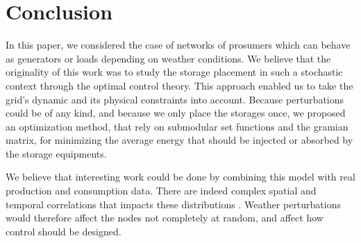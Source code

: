 \documentclass[conference]{IEEEtran}
\begin{document}
\section{Conclusion}
\label{sec:Conclusion}
In this paper, we considered the case of networks of prosumers which can behave as generators or loads depending on weather conditions. We believe that the originality of this work was to study the storage placement in such a stochastic context through the optimal control theory. This approach enabled us to take the grid's dynamic and its physical constraints into account. Because perturbations could be of any kind, and because we only place the storages once, we proposed an optimization method, that rely on submodular set functions and the gramian matrix, for minimizing the average energy that should be injected or absorbed by the storage equipments.

We believe that interesting work could be done by combining this model with real production and consumption data. There are indeed complex spatial and temporal correlations that impacts these distributions \cite{Gensollen2014}. Weather perturbations would therefore affect the nodes not completely at random, and affect how control should be designed. 


  

\end{document}
